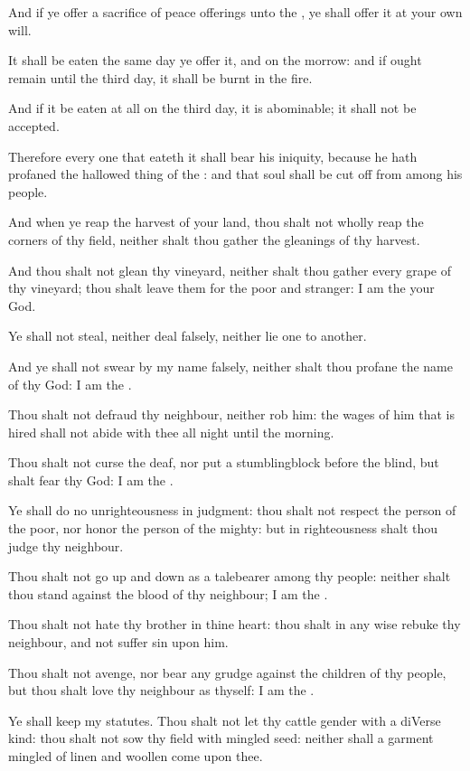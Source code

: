 \Verse And if ye offer a sacrifice of peace offerings unto the \LORD, ye shall offer it at your own will.

\Verse It shall be eaten the same day ye offer it, and on the morrow: and if ought remain until the third day, it shall be burnt in the fire.

\Verse And if it be eaten at all on the third day, it is abominable; it shall not be accepted.

\Verse Therefore every one that eateth it shall bear his iniquity, because he hath profaned the hallowed thing of the \LORD: and that soul shall be cut off from among his people.

\Verse And when ye reap the harvest of your land, thou shalt not wholly reap the corners of thy field, neither shalt thou gather the gleanings of thy harvest.

\Verse And thou shalt not glean thy vineyard, neither shalt thou gather every grape of thy vineyard; thou shalt leave them for the poor and stranger: I am the \LORD your God.

\Verse Ye shall not steal, neither deal falsely, neither lie one to another.

\Verse And ye shall not swear by my name falsely, neither shalt thou profane the name of thy God: I am the \LORD.

\Verse Thou shalt not defraud thy neighbour, neither rob him: the wages of him that is hired shall not abide with thee all night until the morning.

\Verse Thou shalt not curse the deaf, nor put a stumblingblock before the blind, but shalt fear thy God: I am the \LORD.

\Verse Ye shall do no unrighteousness in judgment: thou shalt not respect the person of the poor, nor honor the person of the mighty: but in righteousness shalt thou judge thy neighbour.

\Verse Thou shalt not go up and down as a talebearer among thy people: neither shalt thou stand against the blood of thy neighbour; I am the \LORD.

\Verse Thou shalt not hate thy brother in thine heart: thou shalt in any wise rebuke thy neighbour, and not suffer sin upon him.

\Verse Thou shalt not avenge, nor bear any grudge against the children of thy people, but thou shalt love thy neighbour as thyself: I am the \LORD.

\Verse Ye shall keep my statutes. Thou shalt not let thy cattle gender with a diVerse kind: thou shalt not sow thy field with mingled seed: neither shall a garment mingled of linen and woollen come upon thee.


